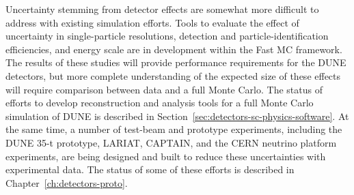 Uncertainty stemming from detector effects
are somewhat more difficult to address with existing
simulation efforts. Tools to evaluate the effect of uncertainty in single-particle resolutions,
detection and particle-identification efficiencies, and energy scale are in development within
the Fast MC framework. The results of these studies will provide performance requirements
for the DUNE detectors, but more complete understanding of the expected size of these effects
will require comparison between data and a full Monte Carlo.
The status of efforts to develop reconstruction and analysis tools for a full Monte Carlo simulation
of DUNE is described in Section~\ref{sec:detectors-sc-physics-software}. At the same time,
a number of test-beam and prototype experiments, including the DUNE 35-t prototype,
LARIAT, CAPTAIN, and the CERN neutrino platform experiments, are being designed and built to reduce these
uncertainties with experimental data. The status of some of these efforts is described in
Chapter~\ref{ch:detectors-proto}.











